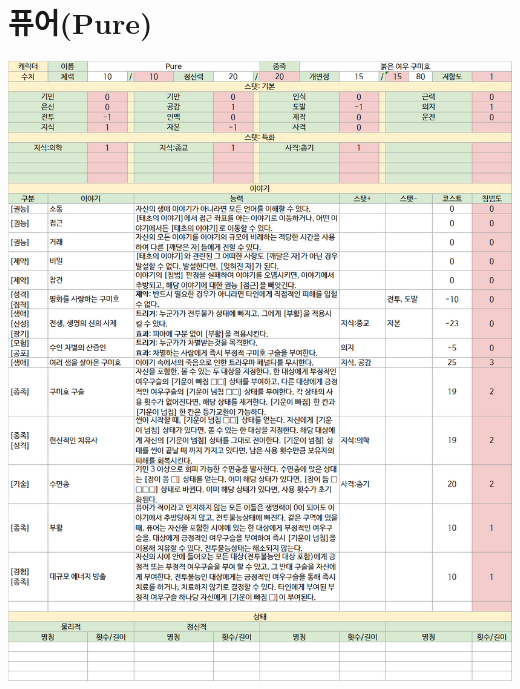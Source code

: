 \documentclass{report}
\begin{document}
	\section*{퓨어(Pure)}
		\includegraphics[width=\textwidth]{./Chapters/WoS/sheets/pure.png}
	
\end{document}
